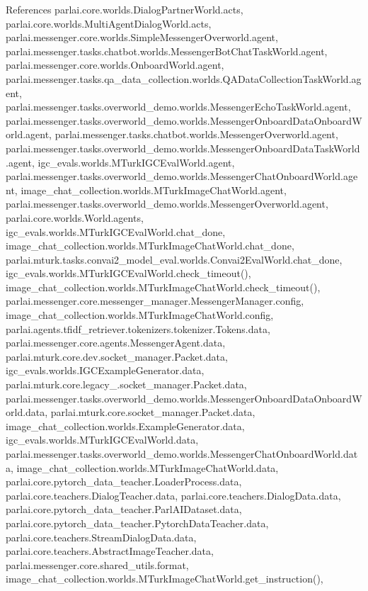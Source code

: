 References parlai.\+core.\+worlds.\+Dialog\+Partner\+World.\+acts, parlai.\+core.\+worlds.\+Multi\+Agent\+Dialog\+World.\+acts, parlai.\+messenger.\+core.\+worlds.\+Simple\+Messenger\+Overworld.\+agent, parlai.\+messenger.\+tasks.\+chatbot.\+worlds.\+Messenger\+Bot\+Chat\+Task\+World.\+agent, parlai.\+messenger.\+core.\+worlds.\+Onboard\+World.\+agent, parlai.\+messenger.\+tasks.\+qa\+\_\+data\+\_\+collection.\+worlds.\+Q\+A\+Data\+Collection\+Task\+World.\+agent, parlai.\+messenger.\+tasks.\+overworld\+\_\+demo.\+worlds.\+Messenger\+Echo\+Task\+World.\+agent, parlai.\+messenger.\+tasks.\+overworld\+\_\+demo.\+worlds.\+Messenger\+Onboard\+Data\+Onboard\+World.\+agent, parlai.\+messenger.\+tasks.\+chatbot.\+worlds.\+Messenger\+Overworld.\+agent, parlai.\+messenger.\+tasks.\+overworld\+\_\+demo.\+worlds.\+Messenger\+Onboard\+Data\+Task\+World.\+agent, igc\+\_\+evals.\+worlds.\+M\+Turk\+I\+G\+C\+Eval\+World.\+agent, parlai.\+messenger.\+tasks.\+overworld\+\_\+demo.\+worlds.\+Messenger\+Chat\+Onboard\+World.\+agent, image\+\_\+chat\+\_\+collection.\+worlds.\+M\+Turk\+Image\+Chat\+World.\+agent, parlai.\+messenger.\+tasks.\+overworld\+\_\+demo.\+worlds.\+Messenger\+Overworld.\+agent, parlai.\+core.\+worlds.\+World.\+agents, igc\+\_\+evals.\+worlds.\+M\+Turk\+I\+G\+C\+Eval\+World.\+chat\+\_\+done, image\+\_\+chat\+\_\+collection.\+worlds.\+M\+Turk\+Image\+Chat\+World.\+chat\+\_\+done, parlai.\+mturk.\+tasks.\+convai2\+\_\+model\+\_\+eval.\+worlds.\+Convai2\+Eval\+World.\+chat\+\_\+done, igc\+\_\+evals.\+worlds.\+M\+Turk\+I\+G\+C\+Eval\+World.\+check\+\_\+timeout(), image\+\_\+chat\+\_\+collection.\+worlds.\+M\+Turk\+Image\+Chat\+World.\+check\+\_\+timeout(), parlai.\+messenger.\+core.\+messenger\+\_\+manager.\+Messenger\+Manager.\+config, image\+\_\+chat\+\_\+collection.\+worlds.\+M\+Turk\+Image\+Chat\+World.\+config, parlai.\+agents.\+tfidf\+\_\+retriever.\+tokenizers.\+tokenizer.\+Tokens.\+data, parlai.\+messenger.\+core.\+agents.\+Messenger\+Agent.\+data, parlai.\+mturk.\+core.\+dev.\+socket\+\_\+manager.\+Packet.\+data, igc\+\_\+evals.\+worlds.\+I\+G\+C\+Example\+Generator.\+data, parlai.\+mturk.\+core.\+legacy\+\_.\+socket\+\_\+manager.\+Packet.\+data, parlai.\+messenger.\+tasks.\+overworld\+\_\+demo.\+worlds.\+Messenger\+Onboard\+Data\+Onboard\+World.\+data, parlai.\+mturk.\+core.\+socket\+\_\+manager.\+Packet.\+data, image\+\_\+chat\+\_\+collection.\+worlds.\+Example\+Generator.\+data, igc\+\_\+evals.\+worlds.\+M\+Turk\+I\+G\+C\+Eval\+World.\+data, parlai.\+messenger.\+tasks.\+overworld\+\_\+demo.\+worlds.\+Messenger\+Chat\+Onboard\+World.\+data, image\+\_\+chat\+\_\+collection.\+worlds.\+M\+Turk\+Image\+Chat\+World.\+data, parlai.\+core.\+pytorch\+\_\+data\+\_\+teacher.\+Loader\+Process.\+data, parlai.\+core.\+teachers.\+Dialog\+Teacher.\+data, parlai.\+core.\+teachers.\+Dialog\+Data.\+data, parlai.\+core.\+pytorch\+\_\+data\+\_\+teacher.\+Parl\+A\+I\+Dataset.\+data, parlai.\+core.\+pytorch\+\_\+data\+\_\+teacher.\+Pytorch\+Data\+Teacher.\+data, parlai.\+core.\+teachers.\+Stream\+Dialog\+Data.\+data, parlai.\+core.\+teachers.\+Abstract\+Image\+Teacher.\+data, parlai.\+messenger.\+core.\+shared\+\_\+utils.\+format, image\+\_\+chat\+\_\+collection.\+worlds.\+M\+Turk\+Image\+Chat\+World.\+get\+\_\+instruction(), 